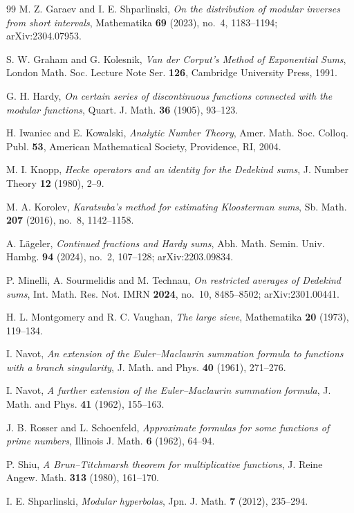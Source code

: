 \begin{thebibliography}{99}
 M. Z. Garaev and I. E. Shparlinski, \emph{On the distribution of modular inverses from short intervals}, Mathematika \textbf{69} (2023), no.~4, 1183--1194; arXiv:2304.07953.

 S. W. Graham and G. Kolesnik, \emph{Van der Corput's Method of Exponential Sums}, London Math. Soc. Lecture Note Ser. \textbf{126}, Cambridge University Press, 1991.

 G. H. Hardy, \emph{On certain series of discontinuous functions connected with the modular functions}, Quart. J. Math. \textbf{36} (1905), 93--123.

 H. Iwaniec and E. Kowalski, \emph{Analytic Number Theory}, Amer. Math. Soc. Colloq. Publ. \textbf{53}, American Mathematical Society, Providence, RI, 2004.

 M. I. Knopp, \emph{Hecke operators and an identity for the Dedekind sums}, J. Number Theory \textbf{12} (1980), 2--9.

 M. A. Korolev, \emph{Karatsuba's method for estimating Kloosterman sums}, Sb. Math. \textbf{207} (2016), no.~8, 1142--1158.

 A. L\"ageler, \emph{Continued fractions and Hardy sums}, Abh. Math. Semin. Univ. Hambg. \textbf{94} (2024), no.~2, 107--128; arXiv:2203.09834.

 P. Minelli, A. Sourmelidis and M. Technau, \emph{On restricted averages of Dedekind sums}, Int. Math. Res. Not. IMRN \textbf{2024}, no.~10, 8485--8502; arXiv:2301.00441.

 H. L. Montgomery and R. C. Vaughan, \emph{The large sieve}, Mathematika \textbf{20} (1973), 119--134.

 I. Navot, \emph{An extension of the Euler--Maclaurin summation formula to functions with a branch singularity}, J. Math. and Phys. \textbf{40} (1961), 271--276.

 I. Navot, \emph{A further extension of the Euler--Maclaurin summation formula}, J. Math. and Phys. \textbf{41} (1962), 155--163.

 J. B. Rosser and L. Schoenfeld, \emph{Approximate formulas for some functions of prime numbers}, Illinois J. Math. \textbf{6} (1962), 64--94.

 P. Shiu, \emph{A Brun--Titchmarsh theorem for multiplicative functions}, J. Reine Angew. Math. \textbf{313} (1980), 161--170.

 I. E. Shparlinski, \emph{Modular hyperbolas}, Jpn. J. Math. \textbf{7} (2012), 235--294.


\end{thebibliography}
